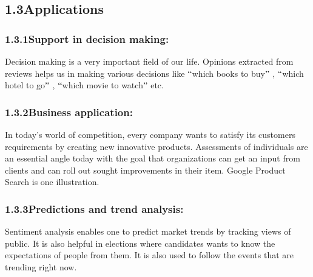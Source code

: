 \documentclass[12pt]{article}
\begin{document}
\newpage

\vspace{\baselineskip}

\vspace{\baselineskip}
\subsection*{1.3\hspace*{10pt}Applications}
\subsubsection*{1.3.1\hspace*{10pt}Support in decision making:}
\begin{justify}
Decision making is a very important field of our life. Opinions extracted from reviews helps us in making various decisions like $``$which books to buy$"$ , $``$which hotel to go$"$ , $``$which movie to watch$"$  etc.
\end{justify}\par

\subsubsection*{1.3.2\hspace*{10pt}Business application:}
\begin{justify}
In today’s world of competition, every company wants to satisfy its customers requirements by creating new innovative products. Assessments of individuals are an essential angle today with the goal that organizations can get an input from clients and can roll out sought improvements in their item. Google Product Search is one illustration.
\end{justify}\par

\subsubsection*{1.3.3\hspace*{10pt}Predictions and trend analysis:}
\begin{justify}
Sentiment analysis enables one to predict market trends by tracking views of public. It is also helpful in elections where candidates wants to know the expectations of people from them. It is also used to follow the events that are trending right now.
\end{justify}\par
\end{document}
